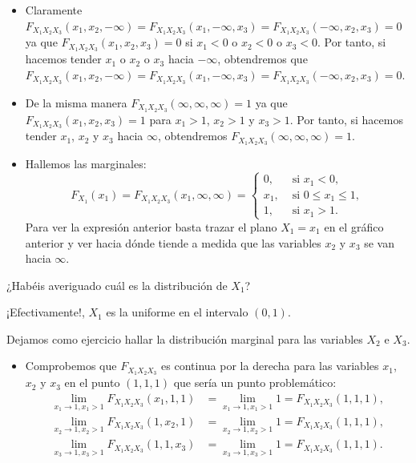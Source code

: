 \documentclass[]{book}
\providecommand{\tightlist}{%
  \setlength{\itemsep}{0pt}\setlength{\parskip}{0pt}}
\begin{document}
\begin{itemize}
\item
  Claramente \(F_{X_1X_2X_3}(x_1,x_2,-\infty)=F_{X_1X_2X_3}(x_1,-\infty,x_3)=F_{X_1X_2X_3}(-\infty,x_2,x_3)=0\) ya que \(F_{X_1X_2X_3}(x_1,x_2,x_3)=0\) si \(x_1<0\) o \(x_2<0\) o \(x_3<0\). Por tanto, si hacemos tender \(x_1\) o \(x_2\) o \(x_3\) hacia \(-\infty\), obtendremos que \(F_{X_1X_2X_3}(x_1,x_2,-\infty)=F_{X_1X_2X_3}(x_1,-\infty,x_3)=F_{X_1X_2X_3}(-\infty,x_2,x_3)=0\).
\item
  De la misma manera \(F_{X_1X_2X_3}(\infty,\infty,\infty)=1\) ya que \(F_{X_1X_2X_3}(x_1,x_2,x_3)=1\) para \(x_1>1\), \(x_2>1\) y \(x_3>1\). Por tanto, si hacemos tender \(x_1\), \(x_2\) y \(x_3\) hacia \(\infty\), obtendremos \(F_{X_1X_2X_3}(\infty,\infty,\infty)=1\).
\item
  Hallemos las marginales:
  \[
  F_{X_1}(x_1)=F_{X_1X_2X_3}(x_1,\infty,\infty)=\begin{cases}
  0, & \mbox{ si }x_1 < 0,\\
  x_1, & \mbox{ si } 0\leq x_1\leq 1,\\
  1, & \mbox{ si } x_1>1.
  \end{cases}
  \]
  Para ver la expresión anterior basta trazar el plano \(X_1=x_1\) en el gráfico anterior y ver hacia dónde tiende a medida que las variables \(x_2\) y \(x_3\) se van hacia \(\infty\).
\end{itemize}

¿Habéis averiguado cuál es la distribución de \(X_1\)?

¡Efectivamente!, \(X_1\) es la uniforme en el intervalo \((0,1)\).

Dejamos como ejercicio hallar la distribución marginal para las variables \(X_2\) e \(X_3\).

\begin{itemize}
\tightlist
\item
  Comprobemos que \(F_{X_1X_2X_3}\) es continua por la derecha para las variables \(x_1\), \(x_2\) y \(x_3\) en el punto \((1,1,1)\) que sería un punto problemático:
  \[
  \begin{array}{rl}
   \lim_{x_1\to 1,x_1> 1} F_{X_1X_2X_3}(x_1,1,1) & =\lim_{x_1\to 1,x_1> 1} 1  = F_{X_1X_2X_3}(1,1,1),\\
   \lim_{x_2\to 1,x_2> 1} F_{X_1X_2X_3}(1,x_2,1) & =\lim_{x_2\to 1,x_2> 1} 1 = F_{X_1X_2X_3}(1,1,1),\\  
  \lim_{x_3\to 1,x_3> 1} F_{X_1X_2X_3}(1,1,x_3) & =\lim_{x_3\to 1,x_3> 1} 1  = F_{X_1X_2X_3}(1,1,1).
  \end{array}
  \]
\end{itemize}
\end{document}
